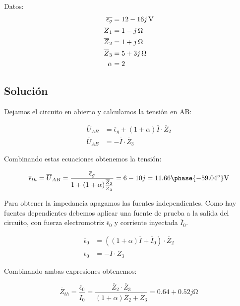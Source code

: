 \documentclass[12pt]{article}
\begin{document}
Datos:
\begin{align*}
  \overline{\epsilon_g} &= \SI[parse-numbers=false]{12 - 16j}{\volt}\\
  \overline{Z}_1 &= \SI[parse-numbers=false]{1 - j}{\ohm}\\
  \overline{Z}_2 &= \SI[parse-numbers=false]{1 + j}{\ohm}\\
  \overline{Z}_3 &= \SI[parse-numbers=false]{5 + 3j}{\ohm}\\
  \alpha &= 2
\end{align*}

\noindent\hrulefill

\subsection*{Solución}

Dejamos el circuito en abierto y calculamos la tensión en AB:

\begin{align*}
  \overline{U}_{AB} &= \overline{\epsilon}_g + (1 + \alpha) \overline{I} \cdot \overline{Z}_2\\
  \overline{U}_{AB} &= - \overline{I} \cdot \overline{Z}_3
\end{align*}

Combinando estas ecuaciones obtenemos la tensión:

\begin{equation*}
  \overline{\epsilon}_{th} = \overline{U}_{AB} = \frac{\overline{\epsilon}_g}{1 + (1 + \alpha) \frac{\overline{Z}_2}{\overline{Z}_3}} = 6 - 10j = 11.66\phase{\ang{-59.04}}\si{\volt}
\end{equation*}

Para obtener la impedancia apagamos las fuentes independientes. Como hay fuentes dependientes debemos aplicar una fuente de prueba a la salida del circuito, con fuerza electromotriz $\overline{\epsilon}_0$ y corriente inyectada $\overline{I}_0$.

\begin{align*}
  \overline{\epsilon}_0 &= ((1 + \alpha) \overline{I} + \overline{I}_0) \cdot \overline{Z}_2\\
  \overline{\epsilon}_0 &= - \overline{I}\cdot \overline{Z}_3
\end{align*}

Combinando ambas expresiones obtenemos:

\begin{equation*}
  \overline{Z}_{th} = \frac{\overline{\epsilon}_0}{\overline{I}_0} = \frac{\overline{Z}_2 \cdot \overline{Z}_3}{(1 + \alpha) \overline{Z}_2 + \overline{Z}_3} = 0.64 + 0.52j\si{\ohm}
\end{equation*}
\end{document}
